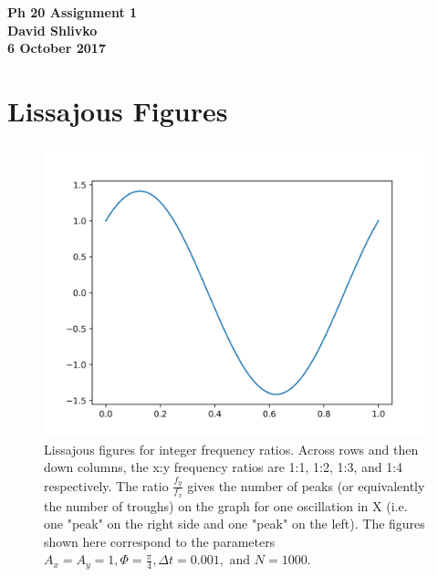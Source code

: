 \documentclass{article}
\begin{document}
\begin{center}
\textbf{\huge{Ph 20 Assignment 1}} \\
\textbf{\Large{David Shlivko}} \\
\textbf{\large{6 October 2017}}
\end{center}

\section{Lissajous Figures}

\begin{figure}[H]
\includegraphics[width=\textwidth]{a1img1.png}
\caption{Lissajous figures for integer frequency ratios. Across rows and then down columns, the x:y frequency ratios are 1:1, 1:2, 1:3, and 1:4 respectively. The ratio $\frac{f_y}{f_x}$ gives the number of peaks (or equivalently the number of troughs) on the graph for one oscillation in X (i.e. one "peak" on the right side and one "peak" on the left). The figures shown here correspond to the parameters $A_x = A_y = 1, \Phi = \frac{\pi}{4}, \Delta t = 0.001,\text{ and }N = 1000.$}
\end{figure}
\end{document}
